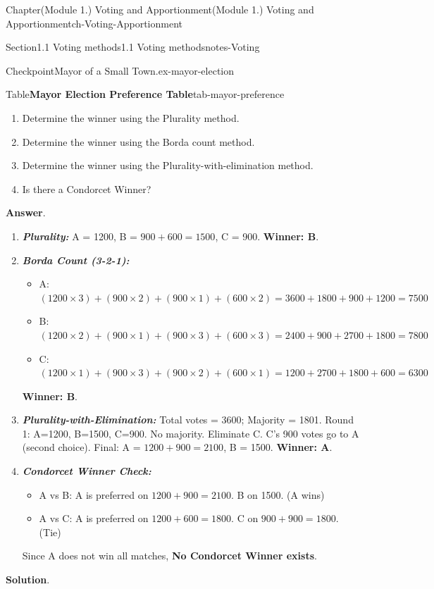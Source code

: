 \documentclass[oneside,10pt,]{book}
\newcommand{\blocktitlefont}{\relax}
\newcommand{\ptxlistdisc}{\raisebox{0.3ex}{\textbullet}}
\newcommand{\alert}[1]{\textbf{\textit{#1}}}
\newcommand{\terminology}[1]{\textbf{#1}}
\begin{document}
\begin{chapterptx}{Chapter}{(Module 1.) Voting and Apportionment}{}{(Module 1.) Voting and Apportionment}{}{}{ch-Voting-Apportionment}
\begin{sectionptx}{Section}{1.1 Voting methods}{}{1.1 Voting methods}{}{}{notes-Voting}
\begin{inlineexercise}{Checkpoint}{Mayor of a Small Town.}{ex-mayor-election}
\begin{tableptx}{Table}{\textbf{Mayor Election Preference Table}}{tab-mayor-preference}{}
{}%
\end{tableptx}%
%
\begin{enumerate}
\item{}Determine the winner using the Plurality method.%
\item{}Determine the winner using the Borda count method.%
\item{}Determine the winner using the Plurality-with-elimination method.%
\item{}Is there a Condorcet Winner?%
\end{enumerate}
%
\par\smallskip%
\noindent\textbf{\blocktitlefont Answer}.\hypertarget{ex-mayor-election-3}{}\quad{}%
\begin{enumerate}
\item{}\alert{Plurality:} A = 1200, B = \(900 + 600 = 1500\), C = 900. \terminology{Winner: B}.%
\item{}\alert{Borda Count (3-2-1):}%
\begin{itemize}[label=\ptxlistdisc]
\item{}A: \((1200 \times 3) + (900 \times 2) + (900 \times 1) + (600 \times 2) = 3600 + 1800 + 900 + 1200 = 7500\)%
\item{}B: \((1200 \times 2) + (900 \times 1) + (900 \times 3) + (600 \times 3) = 2400 + 900 + 2700 + 1800 = 7800\)%
\item{}C: \((1200 \times 1) + (900 \times 3) + (900 \times 2) + (600 \times 1) = 1200 + 2700 + 1800 + 600 = 6300\)%
\end{itemize}
\terminology{Winner: B}.%
\item{}\alert{Plurality-with-Elimination:} Total votes = 3600; Majority = 1801. Round 1: A=1200, B=1500, C=900. No majority. Eliminate C. C's 900 votes go to A (second choice). Final: A = \(1200 + 900 = 2100\), B = 1500. \terminology{Winner: A}.%
\item{}\alert{Condorcet Winner Check:}%
\begin{itemize}[label=\ptxlistdisc]
\item{}A vs B: A is preferred on \(1200 + 900 = 2100\). B on 1500. (A wins)%
\item{}A vs C: A is preferred on \(1200 + 600 = 1800\). C on \(900 + 900 = 1800\). (Tie)%
\end{itemize}
Since A does not win all matches, \terminology{No Condorcet Winner exists}.%
\end{enumerate}
%
\par\smallskip%
\noindent\textbf{\blocktitlefont Solution}.\hypertarget{ex-mayor-election-4}{}\quad{}%

\end{inlineexercise}
\end{sectionptx}
\end{chapterptx}
\end{document}
